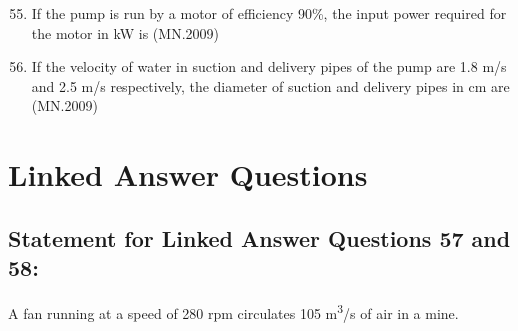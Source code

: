 \documentclass[journal]{IEEEtran}
\numberwithin{equation}{enumi}
\numberwithin{figure}{enumi}
\begin{document}
\begin{enumerate}[label=Q.\arabic*]
\setcounter{enumi}{54}

\item If the pump is run by a motor of efficiency 90\%, the input power required for the motor in kW is
\hfill{(MN.2009)}
\begin{enumerate}[label=(\Alph*)]
\end{enumerate}

\item If the velocity of water in suction and delivery pipes of the pump are 1.8 m/s and 2.5 m/s respectively, the diameter of suction and delivery pipes in cm are
\hfill{(MN.2009)}
\begin{enumerate}[label=(\Alph*)]
\end{enumerate}
\end{enumerate}

\section*{Linked Answer Questions}

\subsection*{Statement for Linked Answer Questions 57 and 58:}

A fan running at a speed of 280 rpm circulates 105 m\textsuperscript{3}/s of air in a mine.
\end{document}
